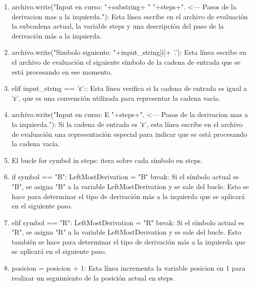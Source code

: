 \begin{enumerate}
\begin{enumerate}
    \item archivo.write("Input en curso: "+substring+ " "+steps+". <--- Pasos de la derivacion mas a la izquierda.\n"): Esta línea escribe en el archivo de evaluación la subcadena actual, la variable steps y una descripción del paso de la derivación más a la izquierda.\newline
    
    \item archivo.write("Simbolo siguiente: "+input\_string[i]+ '.\n'): Esta línea escribe en el archivo de evaluación el siguiente símbolo de la cadena de entrada que se está procesando en ese momento.\newline
    
    \item elif input\_string == 'ε':: Esta línea verifica si la cadena de entrada es igual a 'ε', que es una convención utilizada para representar la cadena vacía.\newline
    
    \item archivo.write("Input en curso: E "+steps+". <--- Pasos de la derivacion mas a la izquierda.\n"): Si la cadena de entrada es 'ε', esta línea escribe en el archivo de evaluación una representación especial para indicar que se está procesando la cadena vacía.\newline
    
    \item El bucle for symbol in steps: itera sobre cada símbolo en steps.\newline
    
    \item if symbol == "B": LeftMostDerivation = "B" break: Si el símbolo actual es "B", se asigna "B" a la variable LeftMostDerivation y se sale del bucle. Esto se hace para determinar el tipo de derivación más a la izquierda que se aplicará en el siguiente paso.\newline
    
    \item elif symbol == "R": LeftMostDerivation = "R" break: Si el símbolo actual es "R", se asigna "R" a la variable LeftMostDerivation y se sale del bucle. Esto también se hace para determinar el tipo de derivación más a la izquierda que se aplicará en el siguiente paso.\newline
    
    \item posicion = posicion + 1: Esta línea incrementa la variable posicion en 1 para realizar un seguimiento de la posición actual en steps.\newline
    

\end{enumerate}
\end{enumerate}
